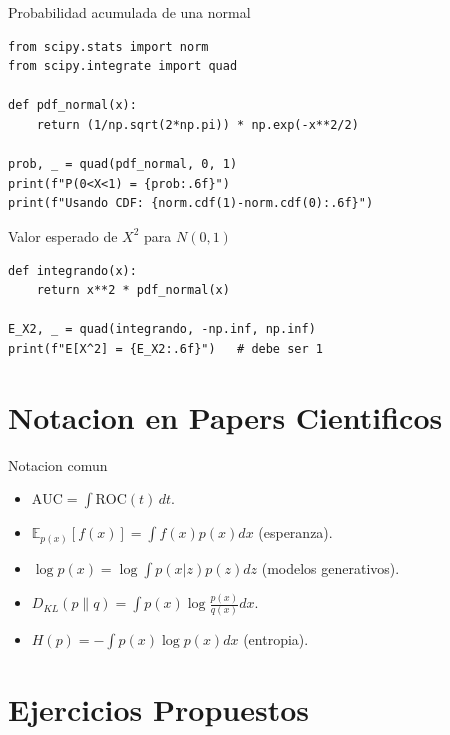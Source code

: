 \documentclass[aspectratio=169, 10pt, xcolor=table]{beamer}
\begin{document}
\begin{frame}[fragile]{Probabilidad acumulada de una normal}
    \begin{lstlisting}
from scipy.stats import norm
from scipy.integrate import quad

def pdf_normal(x):
    return (1/np.sqrt(2*np.pi)) * np.exp(-x**2/2)

prob, _ = quad(pdf_normal, 0, 1)
print(f"P(0<X<1) = {prob:.6f}")
print(f"Usando CDF: {norm.cdf(1)-norm.cdf(0):.6f}")
    \end{lstlisting}
\end{frame}

\begin{frame}[fragile]{Valor esperado de $X^2$ para $N(0,1)$}
    \begin{lstlisting}
def integrando(x):
    return x**2 * pdf_normal(x)

E_X2, _ = quad(integrando, -np.inf, np.inf)
print(f"E[X^2] = {E_X2:.6f}")   # debe ser 1
    \end{lstlisting}
\end{frame}

\section{Notacion en Papers Cientificos}

\begin{frame}{Notacion comun}
    \begin{itemize}
        \item $\text{AUC} = \int \text{ROC}(t)\,dt$.
        \item $\mathbb{E}_{p(x)}[f(x)] = \int f(x)p(x)dx$ (esperanza).
        \item $\log p(x) = \log \int p(x|z)p(z)dz$ (modelos generativos).
        \item $D_{KL}(p\|q) = \int p(x)\log\frac{p(x)}{q(x)}dx$.
        \item $H(p) = -\int p(x)\log p(x)dx$ (entropia).
    \end{itemize}
\end{frame}

\section{Ejercicios Propuestos}
\end{document}
